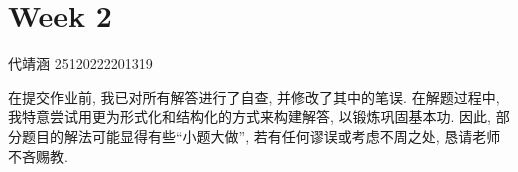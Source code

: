 \documentclass[../main.tex]{subfiles}
\begin{document}
\ifSubfilesClassLoaded{

    
    \setcounter{chapter}{1}
}{}

\chapter{ Week 2 }

代靖涵 25120222201319

\begin{remark}
   在提交作业前, 我已对所有解答进行了自查, 并修改了其中的笔误. 在解题过程中, 我特意尝试用更为形式化和结构化的方式来构建解答, 以锻炼巩固基本功. 
因此, 部分题目的解法可能显得有些“小题大做”, 若有任何谬误或考虑不周之处, 恳请老师不吝赐教.
\end{remark}
\end{document}

